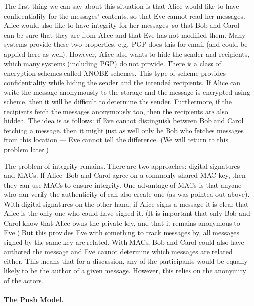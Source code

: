 The first thing we can say about this situation is that Alice would like to 
have confidentiality for the messages' contents, so that Eve cannot read her 
messages.
Alice would also like to have integrity for her messages, so that Bob and Carol 
can be sure that they are from Alice and that Eve has not modified them.
Many systems provide these two properties, e.g.\ \ac{PGP} does this for email 
(and could be applied here as well).
However, Alice also wants to hide the sender and recipients, which many systems 
(including \ac{PGP}) do not provide.
There is a class of encryption schemes called \ac{ANOBE} schemes.
This type of scheme provides confidentiality while hiding the sender and the 
intended recipients.
If Alice can write the message anonymously to the storage and the message is 
encrypted using  scheme, then it will be difficult to determine the 
sender.
Furthermore, if the recipients fetch the messages anonymously too, then the 
recipients are also hidden.
The idea is as follows: if Eve cannot distinguish between Bob and Carol 
fetching a message, then it might just as well only be Bob who fetches messages 
from this location --- Eve cannot tell the difference.
(We will return to this problem later.)

The problem of integrity remains.
There are two approaches: digital signatures and \acp{MAC}.
If Alice, Bob and Carol agree on a commonly shared \ac{MAC} key, then they can 
use \acp{MAC} to ensure integrity.
One advantage of \acp{MAC} is that anyone who can verify the authenticity of 
 can also create one (as was pointed out above).
With digital signatures on the other hand, if Alice signs a message it is clear 
that Alice is the only one who could have signed it.
(It is important that only Bob and Carol know that Alice owns the private key, 
and that it remains anonymous to Eve.)
But this provides Eve with something to track messages by, all messages signed 
by the same key are related.
With \acp{MAC}, Bob and Carol could also have authored the message and Eve 
cannot determine which messages are related either.
This means that for a discussion, any of the participants would be equally 
likely to be the author of a given message.
However, this relies on the anonymity of the actors.

\paragraph{The Push Model.}

